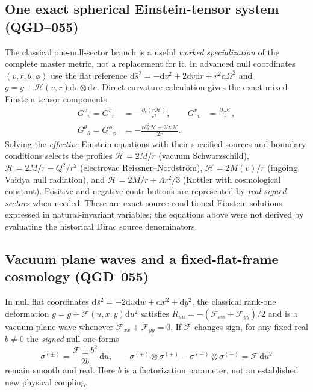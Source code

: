 \documentclass[11pt,a4paper]{article}
\newcommand{\dd}{\mathrm d}
\begin{document}
\subsection{One exact spherical Einstein-tensor system (QGD--055)}\label{sec:qgd060-spherical}
The classical one-null-sector branch is a useful \emph{worked specialization} of the complete master metric, not a replacement for it.  In advanced null coordinates $(v,r,\theta,\phi)$ use the flat reference $\dd\bar s^2=-\dd v^2+2\dd v\dd r+r^2\dd\Omega^2$ and $g=\bar g+\mathcal H(v,r)\dd v\otimes\dd v$.  Direct curvature calculation gives the exact mixed Einstein-tensor components
\begin{equation}\label{eq:qgd060-spherical-Einstein}
 \boxed{\begin{aligned}
 G^v{}_v=G^r{}_r&=-\frac{\partial_r(r\mathcal H)}{r^2},&
 G^r{}_v&=\frac{\partial_v\mathcal H}{r},\\
 G^\theta{}_\theta=G^\phi{}_\phi&=-\frac{r\partial_r^2\mathcal H+2\partial_r\mathcal H}{2r}.&&
 \end{aligned}}
\end{equation}
Solving the \emph{effective} Einstein equations with their specified sources and boundary conditions selects the profiles $\mathcal H=2M/r$ (vacuum Schwarzschild), $\mathcal H=2M/r-Q^2/r^2$ (electrovac Reissner--Nordstr\"om), $\mathcal H=2M(v)/r$ (ingoing Vaidya null radiation), and $\mathcal H=2M/r+\Lambda r^2/3$ (Kottler with cosmological constant).  Positive and negative contributions are represented by \emph{real signed sectors} when needed.  These are exact source-conditioned Einstein solutions expressed in natural-invariant variables; the equations above were not derived by evaluating the historical Dirac source denominators.

\subsection{Vacuum plane waves and a fixed-flat-frame cosmology (QGD--055)}\label{sec:qgd060-nonks}
In null flat coordinates $\dd\bar s^2=-2\dd u\dd w+\dd x^2+\dd y^2$, the classical rank-one deformation $g=\bar g+\mathcal F(u,x,y)\dd u^2$ satisfies $R_{uu}=-(\mathcal F_{xx}+\mathcal F_{yy})/2$ and is a vacuum plane wave whenever $\mathcal F_{xx}+\mathcal F_{yy}=0$.  If $\mathcal F$ changes sign, for any fixed real $b\ne0$ the \emph{signed} null one-forms
\begin{equation}\label{eq:qgd060-pp-signed}
 \sigma^{(\pm)}=\frac{\mathcal F\pm b^2}{2b}\,\dd u,\qquad
 \sigma^{(+)}\otimes\sigma^{(+)}-\sigma^{(-)}\otimes\sigma^{(-)}
 =\mathcal F\,\dd u^2
\end{equation}
remain smooth and real.  Here $b$ is a factorization parameter, not an established new physical coupling.
\end{document}
